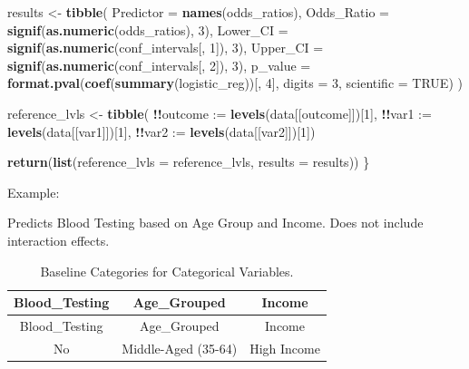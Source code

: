 \documentclass[
]{article}
\newenvironment{Shaded}{\begin{snugshade}}{\end{snugshade}}
\newcommand{\AttributeTok}[1]{\textcolor[rgb]{0.13,0.29,0.53}{#1}}
\newcommand{\ConstantTok}[1]{\textcolor[rgb]{0.56,0.35,0.01}{#1}}
\newcommand{\DecValTok}[1]{\textcolor[rgb]{0.00,0.00,0.81}{#1}}
\newcommand{\FunctionTok}[1]{\textcolor[rgb]{0.13,0.29,0.53}{\textbf{#1}}}
\newcommand{\NormalTok}[1]{#1}
\newcommand{\OtherTok}[1]{\textcolor[rgb]{0.56,0.35,0.01}{#1}}
\newcommand{\SpecialCharTok}[1]{\textcolor[rgb]{0.81,0.36,0.00}{\textbf{#1}}}
\begin{document}
\begin{Shaded}
\begin{Highlighting}[]
\NormalTok{  results }\OtherTok{\textless{}{-}} \FunctionTok{tibble}\NormalTok{(}
    \AttributeTok{Predictor =} \FunctionTok{names}\NormalTok{(odds\_ratios),}
    \AttributeTok{Odds\_Ratio =} \FunctionTok{signif}\NormalTok{(}\FunctionTok{as.numeric}\NormalTok{(odds\_ratios), }\DecValTok{3}\NormalTok{),}
    \AttributeTok{Lower\_CI =} \FunctionTok{signif}\NormalTok{(}\FunctionTok{as.numeric}\NormalTok{(conf\_intervals[, }\DecValTok{1}\NormalTok{]), }\DecValTok{3}\NormalTok{),}
    \AttributeTok{Upper\_CI =} \FunctionTok{signif}\NormalTok{(}\FunctionTok{as.numeric}\NormalTok{(conf\_intervals[, }\DecValTok{2}\NormalTok{]), }\DecValTok{3}\NormalTok{),}
    \AttributeTok{p\_value =} \FunctionTok{format.pval}\NormalTok{(}\FunctionTok{coef}\NormalTok{(}\FunctionTok{summary}\NormalTok{(logistic\_reg))[, }\DecValTok{4}\NormalTok{], }\AttributeTok{digits =} \DecValTok{3}\NormalTok{, }\AttributeTok{scientific =} \ConstantTok{TRUE}\NormalTok{)}
\NormalTok{  )}
  
\NormalTok{  reference\_lvls }\OtherTok{\textless{}{-}} \FunctionTok{tibble}\NormalTok{(}
    \SpecialCharTok{!!}\AttributeTok{outcome :=} \FunctionTok{levels}\NormalTok{(data[[outcome]])[}\DecValTok{1}\NormalTok{],}
    \SpecialCharTok{!!}\AttributeTok{var1 :=} \FunctionTok{levels}\NormalTok{(data[[var1]])[}\DecValTok{1}\NormalTok{],}
    \SpecialCharTok{!!}\AttributeTok{var2 :=} \FunctionTok{levels}\NormalTok{(data[[var2]])[}\DecValTok{1}\NormalTok{])}
  
  \FunctionTok{return}\NormalTok{(}\FunctionTok{list}\NormalTok{(}\AttributeTok{reference\_lvls =}\NormalTok{ reference\_lvls, }\AttributeTok{results =}\NormalTok{ results))}
\NormalTok{\}}
\end{Highlighting}
\end{Shaded}

Example:

Predicts Blood Testing based on Age Group and Income. Does not include
interaction effects.

\begin{longtable}[]{@{}ccc@{}}
\caption{Baseline Categories for Categorical Variables.}\tabularnewline
\toprule\noalign{}
Blood\_Testing & Age\_Grouped & Income \\
\midrule\noalign{}
\endfirsthead
\toprule\noalign{}
Blood\_Testing & Age\_Grouped & Income \\
\midrule\noalign{}
\endhead
\bottomrule\noalign{}
\endlastfoot
No & Middle-Aged (35-64) & High Income \\
\end{longtable}
\end{document}
